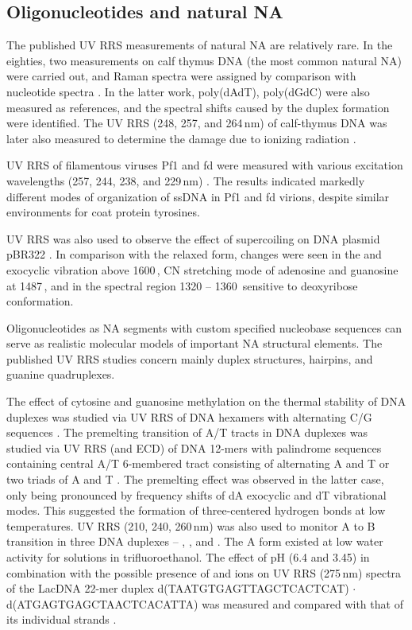 \subsection{Oligonucleotides and natural NA}

The published UV RRS measurements of natural NA are relatively rare.
In the eighties, two measurements on calf thymus DNA (the most common natural
NA) were carried out, and Raman spectra were assigned by comparison with
nucleotide spectra
\parencite{%
	Laigle1982a,%
	Fodor1986a%
}.
In the latter work, poly(dAdT), poly(dGdC) were also measured as references,
and the spectral shifts caused by the duplex formation were identified.
The UV RRS (248, 257, and 264\,nm) of calf-thymus DNA was later also measured
to determine the damage due to ionizing radiation
\parencite{Shaw2009}.

UV RRS of filamentous viruses Pf1 and fd were measured with various excitation
wavelengths (257, 244, 238, and 229\,nm)
\parencite{Wen1999}.
The results indicated markedly different modes of organization of ssDNA in Pf1
and fd virions, despite similar environments for coat protein tyrosines.

UV RRS was also used to observe the effect of supercoiling on DNA plasmid
pBR322
\parencite{Neugebauer2007}.
In comparison with the relaxed form, changes were seen in the  and
exocyclic  vibration above 1600\,\icm{}, CN stretching mode of
adenosine and guanosine at 1487\,\icm{}, and in the spectral region
1320 -- 1360\,\icm{} sensitive to deoxyribose conformation.

Oligonucleotides as NA segments with custom specified nucleobase sequences
can serve as realistic molecular models of important NA structural elements.
The published UV RRS studies concern mainly duplex structures, hairpins, and
guanine quadruplexes.

The effect of cytosine and guanosine methylation on the thermal stability of
DNA duplexes was studied via UV RRS of DNA hexamers with alternating C/G
sequences
\parencite{%
	Laigle1986,%
	Chinsky1987%
}.
The premelting transition of A/T tracts in DNA duplexes was studied
via UV RRS (and ECD) of DNA 12-mers with palindrome sequences containing
central A/T 6-membered tract consisting of alternating A and T or two triads of
A and T
\parencite{Mukerji2002}.
The premelting effect was observed in the latter case, only being pronounced by
frequency shifts of dA exocyclic  and dT 
vibrational modes.
This suggested the formation of three-centered hydrogen bonds at low
temperatures.
UV RRS (210, 240, 260\,nm) was also used to monitor A to B transition in three
DNA duplexes --
	,
	,
	and 
\parencite{Knee2008}.
The A form existed at low water activity for solutions in trifluoroethanol.
The effect of pH (6.4 and 3.45) in combination with the possible presence of
 and  ions on UV RRS (275\,nm) spectra of the LacDNA
22-mer duplex
	d(TAATGTGAGTT\allowbreak{}AGCTCACTCAT)%
	$\cdot$%
	d(ATGAGTGAGCT\allowbreak{}AACTCACATTA)
was measured
and compared with that of its individual strands
\parencite{Muntean2013}.

